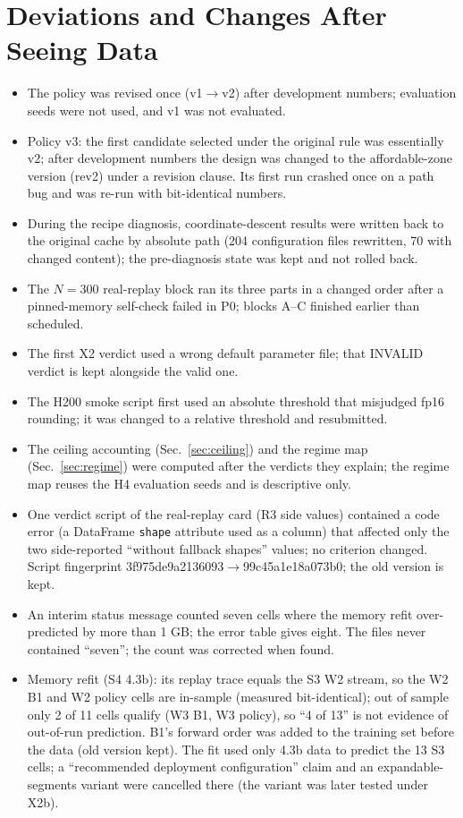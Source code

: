 \documentclass[conference]{IEEEtran}
\newcommand{\tn}[1]{#1}%
\begin{document}
\section{Deviations and Changes After Seeing Data}\label{app:dev}
\begin{itemize}
\item The policy was revised once (v1$\to$v2) after development numbers; evaluation seeds were not used, and v1 was not evaluated.
\item Policy v3: the first candidate selected under the original rule was essentially v2; after development numbers the design was changed to the affordable-zone version (rev2) under a revision clause. Its first run crashed once on a path bug and was re-run with bit-identical numbers.
\item During the recipe diagnosis, coordinate-descent results were written back to the original cache by absolute path (\tn{204} configuration files rewritten, \tn{70} with changed content); the pre-diagnosis state was kept and not rolled back.
\item The $N{=}300$ real-replay block ran its three parts in a changed order after a pinned-memory self-check failed in P0; blocks A--C finished earlier than scheduled.
\item The first X2 verdict used a wrong default parameter file; that INVALID verdict is kept alongside the valid one.
\item The H200 smoke script first used an absolute threshold that misjudged fp16 rounding; it was changed to a relative threshold and resubmitted.
\item The ceiling accounting (Sec.~\ref{sec:ceiling}) and the regime map (Sec.~\ref{sec:regime}) were computed after the verdicts they explain; the regime map reuses the H4 evaluation seeds and is descriptive only.
\item One verdict script of the real-replay card (R3 side values) contained a code error (a DataFrame \texttt{shape} attribute used as a column) that affected only the two side-reported ``without fallback shapes'' values; no criterion changed. Script fingerprint 3f975de9a2136093$\to$99c45a1e18a073b0; the old version is kept.
\item An interim status message counted seven cells where the memory refit over-predicted by more than 1 GB; the error table gives eight. The files never contained ``seven''; the count was corrected when found.
\item Memory refit (S4 4.3b): its replay trace equals the S3 W2 stream, so the W2 B1 and W2 policy cells are in-sample (measured bit-identical); out of sample only 2 of 11 cells qualify (W3 B1, W3 policy), so ``4 of 13'' is not evidence of out-of-run prediction. B1's forward order was added to the training set before the data (old version kept). The fit used only 4.3b data to predict the 13 S3 cells; a ``recommended deployment configuration'' claim and an expandable-segments variant were cancelled there (the variant was later tested under X2b).

\end{itemize}
\end{document}
